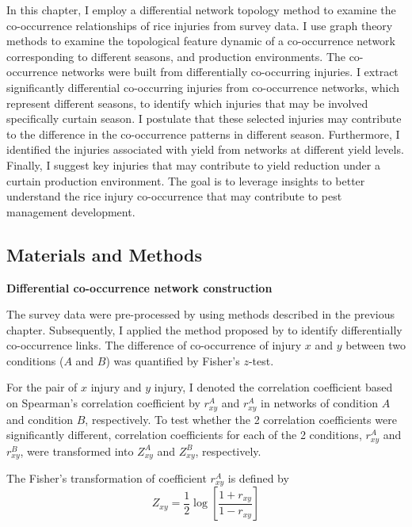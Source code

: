 In this chapter, I employ a differential network topology method to examine the co-occurrence relationships of rice injuries from survey data. I use graph theory methods to examine the topological feature dynamic of a co-occurrence network corresponding to different seasons, and production environments. The co-occurrence networks were built from differentially co-occurring injuries. I extract significantly differential co-occurring injuries from co-occurrence networks, which represent different seasons, to identify which injuries that may be involved specifically curtain season. I postulate that these selected injuries may contribute to the difference in the co-occurrence patterns in different season. Furthermore, I identified the injuries associated with yield from networks at different yield levels. Finally, I suggest key injuries that may contribute to yield reduction under a curtain production environment. The goal is to leverage insights to better understand the rice injury co-occurrence that may contribute to pest management development.

\subsection{Materials and Methods}

\textbf{Differential co-occurrence network construction}

The survey data were pre-processed by using methods described in the previous chapter. Subsequently, I applied the method proposed by \citet{Fukushima_2013_Diffcorr} to identify differentially co-occurrence links. The difference of co-occurrence of injury $x$ and $y$ between two conditions ($A$ and $B$) was quantified by Fisher's $z$-test.
 
For the pair of $x$ injury and $y$ injury, I denoted the correlation coefficient based on Spearman's correlation coefficient by $r_{xy}^A$ and $r_{xy}^A$ in networks of condition $A$ and condition $B$, respectively. To test whether the 2 correlation coefficients were significantly different, correlation coefficients for each of the 2 conditions, $r_{xy}^A$ and $r_{xy}^B$, were transformed into $Z_{xy}^A$ and $Z_{xy}^B$, respectively.


The Fisher's transformation of coefficient $r_{xy}^A$ is defined by
\begin{equation}
\label{eq:zvalue}
Z_{xy} = \frac{1}{2} \log\left[{\frac{1 + r_{xy}}{1 - r_{xy}}}\right]
\end{equation}

